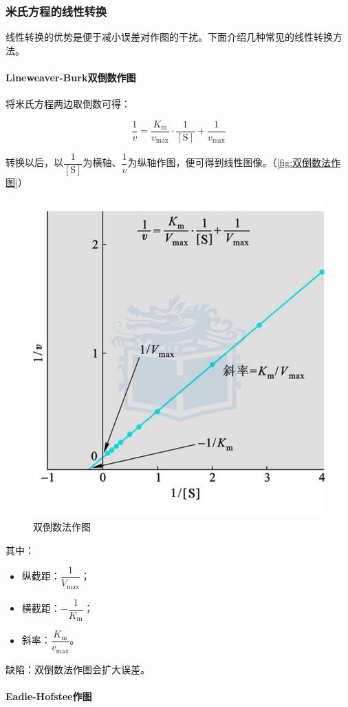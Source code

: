 \subsubsection{米氏方程的线性转换}

线性转换的优势是便于减小误差对作图的干扰。下面介绍几种常见的线性转换方法。

\paragraph{Lineweaver-Burk双倒数作图}

将米氏方程两边取倒数可得：

\[\frac{1}{v} = \frac{K_\text{m}}{v_{\text{max}}} \cdot \frac{1}{[\text{S}]} + \frac{1}{v_{\text{max}}}\]

转换以后，以$\dfrac{1}{[\text{S}]}$为横轴、$\dfrac{1}{v}$为纵轴作图，便可得到线性图像。（\autoref{fig:双倒数法作图}）

\begin{figure}[htbp]
	\centering
	\includegraphics[width=0.5\linewidth]{Pics/双倒数法作图}
	\caption{双倒数法作图}
	\label{fig:双倒数法作图}
\end{figure}

其中：

\begin{itemize}
	\item 纵截距：$\dfrac{1}{V_{\text{max}}}$；
	\item 横截距：$-\dfrac{1}{K_{\text{m}}}$；
	\item 斜率：$\dfrac{K_{\text{m}}}{v_{\text{max}}}$。
\end{itemize}

缺陷：双倒数法作图会扩大误差。

\paragraph{Eadie-Hofstee作图}

